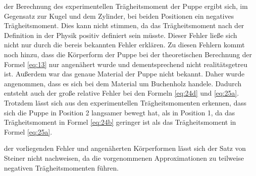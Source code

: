 \justifying der Berechnung des experimentellen Trägheitsmoment der Puppe ergibt
sich, im Gegensatz zur Kugel und dem Zylinder, bei beiden Positionen
 ein negatives Trägheitsmoment. Dies kann nicht stimmen, da das Trägheitsmoment
 nach der Definition in der Physik positiv definiert sein müsste. Dieser Fehler ließe
 sich nicht nur durch die bereis bekannten Fehler erklären. Zu diesen Fehlern kommt
 noch hinzu, dass die Körperform der Puppe bei der theoretischen Berechnung
 der Formel \eqref{eq:13} nur angenähert wurde und dementsprechend nicht
 realitätsgetreu ist. Außerdem war das genaue Material der Puppe nicht bekannt.
 Daher wurde angenommen, dass es sich bei dem Material um Buchenholz handele.
 Dadurch entsteht auch der große relative Fehler bei den Formeln \eqref{eq:24d} und \eqref{eq:25a}.
 Trotzdem lässt sich aus den experimentellen Trägheitsmomenten erkennen, dass
 sich die Puppe in Position 2 langsamer bewegt hat, als in Position 1, da das
 Trägheitsmoment in Formel \eqref{eq:24b} geringer ist als das Trägheitsmoment in
 Formel \eqref{eq:25a}.

 \justifying der vorliegenden Fehler und angenäherten Körperformen lässt sich der Satz von Steiner nicht 
 nachweisen, da die vorgenommenen Approximationen zu teilweise negativen Trägheitsmomenten führen.

\newpage

\printbibliography
